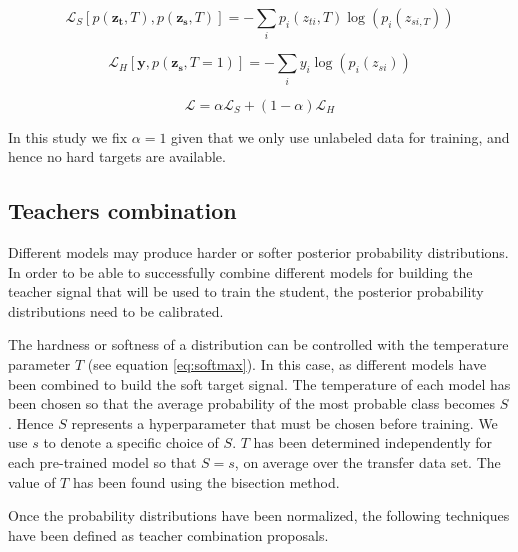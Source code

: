 \documentclass{elsarticle}
\begin{document}
	\begin{equation}
	\mathcal{L}_S\left[p( \mathbf{z_t}, T), p(\mathbf{z_s}, T) \right] = -\sum_i p_i(z_{ti}, T) \log \left(p_i(z_{si, T})\right)
	\label{eq:ced}
	\end{equation}

	\begin{equation}
	\mathcal{L}_{H}\left[\mathbf{y}, p(\mathbf{z_s}, T=1) \right] = -\sum_i y_i \log \left(p_i(z_{si})\right)
	\label{eq:ces}
	\end{equation}

	\begin{equation}
	\mathcal{L} = \alpha \mathcal{L}_S + (1-\alpha) \mathcal{L}_{H}
	\label{eq:loss_distillation}
	\end{equation}

	In this study we fix $\alpha=1$ given that we only use unlabeled data for training, and hence no hard targets are available.

	\subsection{Teachers combination} \label{sec:teachers_comb}
	 Different models may produce harder or softer posterior probability distributions. In order to be able to successfully combine  different models for building the teacher signal that will be used to train the student, the posterior probability distributions need to be calibrated.

	 The hardness or softness of a distribution can be controlled with the temperature parameter $T$ (see equation \ref{eq:softmax}). In this case, as different models have been combined to build the soft target signal. The temperature of each model has been chosen so that the average probability of the most probable class becomes $S$. Hence $S$ represents a hyperparameter that must be chosen before training. We use $s$ to denote a specific choice of $S$.  $T$ has been determined independently for each pre-trained model so that $S=s$, on average over the transfer data set. The value of $T$ has been found using the bisection method.

	 Once the probability distributions have been normalized, the following techniques have been defined as teacher combination proposals.
\end{document}
